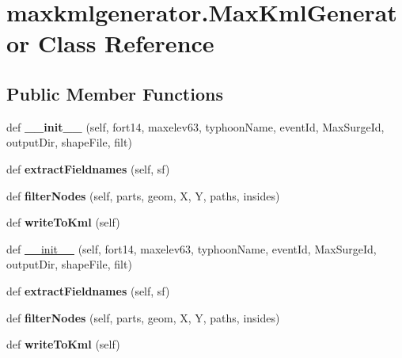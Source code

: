 \hypertarget{classmaxkmlgenerator_1_1_max_kml_generator}{}\section{maxkmlgenerator.\+Max\+Kml\+Generator Class Reference}
\label{classmaxkmlgenerator_1_1_max_kml_generator}
\subsection*{Public Member Functions}
\begin{DoxyCompactItemize}
\item 
\hypertarget{classmaxkmlgenerator_1_1_max_kml_generator_af8ff7b2f6bf5154c7bfcf636cda6dc0a}{}def {\bfseries \+\_\+\+\_\+init\+\_\+\+\_\+} (self, fort14, maxelev63, typhoon\+Name, event\+Id, Max\+Surge\+Id, output\+Dir, shape\+File, filt)\label{classmaxkmlgenerator_1_1_max_kml_generator_af8ff7b2f6bf5154c7bfcf636cda6dc0a}

\item 
\hypertarget{classmaxkmlgenerator_1_1_max_kml_generator_ab97f3148a11e99ad1f5905fde0589b5a}{}def {\bfseries extract\+Fieldnames} (self, sf)\label{classmaxkmlgenerator_1_1_max_kml_generator_ab97f3148a11e99ad1f5905fde0589b5a}

\item 
\hypertarget{classmaxkmlgenerator_1_1_max_kml_generator_a6f47e86c86d6b82373dbfec156536c0c}{}def {\bfseries filter\+Nodes} (self, parts, geom, X, Y, paths, insides)\label{classmaxkmlgenerator_1_1_max_kml_generator_a6f47e86c86d6b82373dbfec156536c0c}

\item 
\hypertarget{classmaxkmlgenerator_1_1_max_kml_generator_a3c6f31b487cb7f403a88aa6997165429}{}def {\bfseries write\+To\+Kml} (self)\label{classmaxkmlgenerator_1_1_max_kml_generator_a3c6f31b487cb7f403a88aa6997165429}

\item 
def \hyperlink{classmaxkmlgenerator_1_1_max_kml_generator_af8ff7b2f6bf5154c7bfcf636cda6dc0a}{\+\_\+\+\_\+init\+\_\+\+\_\+} (self, fort14, maxelev63, typhoon\+Name, event\+Id, Max\+Surge\+Id, output\+Dir, shape\+File, filt)
\item 
\hypertarget{classmaxkmlgenerator_1_1_max_kml_generator_ab97f3148a11e99ad1f5905fde0589b5a}{}def {\bfseries extract\+Fieldnames} (self, sf)\label{classmaxkmlgenerator_1_1_max_kml_generator_ab97f3148a11e99ad1f5905fde0589b5a}

\item 
\hypertarget{classmaxkmlgenerator_1_1_max_kml_generator_a6f47e86c86d6b82373dbfec156536c0c}{}def {\bfseries filter\+Nodes} (self, parts, geom, X, Y, paths, insides)\label{classmaxkmlgenerator_1_1_max_kml_generator_a6f47e86c86d6b82373dbfec156536c0c}

\item 
\hypertarget{classmaxkmlgenerator_1_1_max_kml_generator_a3c6f31b487cb7f403a88aa6997165429}{}def {\bfseries write\+To\+Kml} (self)\label{classmaxkmlgenerator_1_1_max_kml_generator_a3c6f31b487cb7f403a88aa6997165429}

\end{DoxyCompactItemize}
